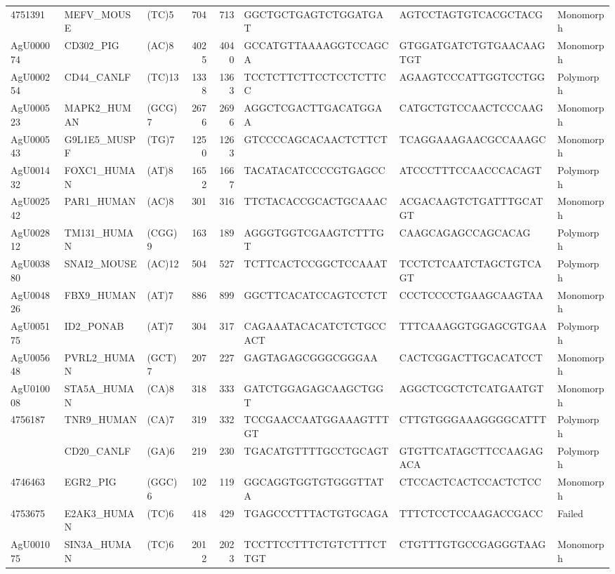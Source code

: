 \documentclass[]{article}
\begin{document}
\begin{longtable}[t]{lllrrlll}
4751391 & MEFV\_MOUSE & (TC)5 & 704 & 713 & GGCTGCTGAGTCTGGATGAT & AGTCCTAGTGTCACGCTACG & Monomorph\\
AgU000074 & CD302\_PIG & (AC)8 & 4025 & 4040 & GCCATGTTAAAAGGTCCAGCA & GTGGATGATCTGTGAACAAGTGT & Monomorph\\
AgU000254 & CD44\_CANLF & (TC)13 & 1338 & 1363 & TCCTCTTCTTCCTCCTCTTCC & AGAAGTCCCATTGGTCCTGG & Polymorph\\
AgU000523 & MAPK2\_HUMAN & (GCG)7 & 2676 & 2696 & AGGCTCGACTTGACATGGAA & CATGCTGTCCAACTCCCAAG & Monomorph\\
\addlinespace
AgU000543 & G9L1E5\_MUSPF & (TG)7 & 1250 & 1263 & GTCCCCAGCACAACTCTTCT & TCAGGAAAGAACGCCAAAGC & Monomorph\\
AgU001432 & FOXC1\_HUMAN & (AT)8 & 1652 & 1667 & TACATACATCCCCGTGAGCC & ATCCCTTTCCAACCCACAGT & Polymorph\\
AgU002542 & PAR1\_HUMAN & (AC)8 & 301 & 316 & TTCTACACCGCACTGCAAAC & ACGACAAGTCTGATTTGCATGT & Monomorph\\
AgU002812 & TM131\_HUMAN & (CGG)9 & 163 & 189 & AGGGTGGTCGAAGTCTTTGT & CAAGCAGAGCCAGCACAG & Polymorph\\
AgU003880 & SNAI2\_MOUSE & (AC)12 & 504 & 527 & TCTTCACTCCGGCTCCAAAT & TCCTCTCAATCTAGCTGTCAGT & Polymorph\\
\addlinespace
AgU004826 & FBX9\_HUMAN & (AT)7 & 886 & 899 & GGCTTCACATCCAGTCCTCT & CCCTCCCCTGAAGCAAGTAA & Monomorph\\
AgU005175 & ID2\_PONAB & (AT)7 & 304 & 317 & CAGAAATACACATCTCTGCCACT & TTTCAAAGGTGGAGCGTGAA & Polymorph\\
AgU005648 & PVRL2\_HUMAN & (GCT)7 & 207 & 227 & GAGTAGAGCGGGCGGGAA & CACTCGGACTTGCACATCCT & Monomorph\\
AgU010008 & STA5A\_HUMAN & (CA)8 & 318 & 333 & GATCTGGAGAGCAAGCTGGT & AGGCTCGCTCTCATGAATGT & Monomorph\\
4756187 & TNR9\_HUMAN & (CA)7 & 319 & 332 & TCCGAACCAATGGAAAGTTTGT & CTTGTGGGAAAGGGGCATTT & Polymorph\\
\addlinespace
4744731 & CD20\_CANLF & (GA)6 & 219 & 230 & TGACATGTTTTGCCTGCAGT & GTGTTCATAGCTTCCAAGAGACA & Polymorph\\
4746463 & EGR2\_PIG & (GGC)6 & 102 & 119 & GGCAGGTGGTGTGGGTTATA & CTCCACTCACTCCACTCTCC & Monomorph\\
4753675 & E2AK3\_HUMAN & (TC)6 & 418 & 429 & TGAGCCCTTTACTGTGCAGA & TTTCTCCTCCAAGACCGACC & Failed\\
AgU001075 & SIN3A\_HUMAN & (TC)6 & 2012 & 2023 & TCCTTCCTTTCTGTCTTTCTTGT & CTGTTTGTGCCGAGGGTAAG & Monomorph\\

\end{longtable}
\end{document}
